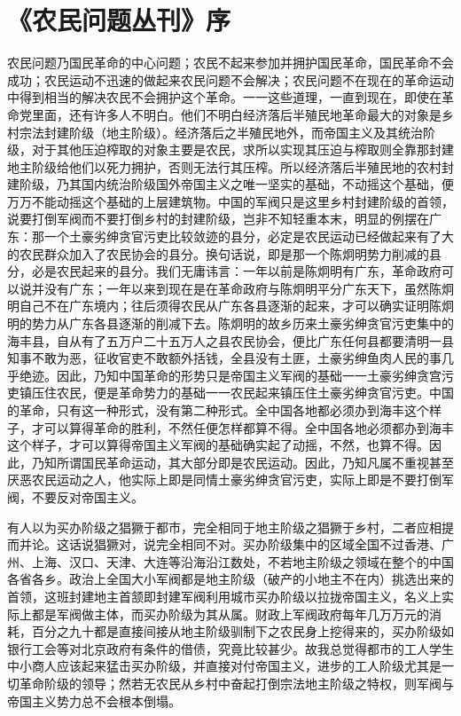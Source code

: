 \section[《农民问题丛刊》序（一九二六年九月一日）]{《农民问题丛刊》序}


农民问题乃国民革命的中心问题；农民不起来参加并拥护国民革命，国民革命不会成功；农民运动不迅速的做起来农民问题不会解决；农民问题不在现在的革命运动中得到相当的解决农民不会拥护这个革命。一一这些道理，一直到现在，即使在革命党里面，还有许多人不明白。他们不明白经济落后半殖民地革命最大的对象是乡村宗法封建阶级（地主阶级）。经济落后之半殖民地外，而帝国主义及其统治阶级，对于其他压迫榨取的对象主要是农民，求所以实现其压迫与榨取则全靠那封建地主阶级给他们以死力拥护，否则无法行其压榨。所以经济落后半殖民地的农村封建阶级，乃其国内统治阶级国外帝国主义之唯一坚实的基础，不动摇这个基础，便万万不能动摇这个基础的上层建筑物。中国的军阀只是这里乡村封建阶级的首领，说要打倒军阀而不要打倒乡村的封建阶级，岂非不知轻重本末，明显的例摆在广东：那一个土豪劣绅贪官污吏比较敛迹的县分，必定是农民运动已经做起来有了大的农民群众加入了农民协会的县分。换句话说，即是那一个陈炯明势力削减的县分，必是农民起来的县分。我们无庸讳言：一年以前是陈炯明有广东，革命政府可以说并没有广东；一年以来到现在是在革命政府与陈炯明平分广东天下，虽然陈炯明自己不在广东境内；往后须得农民从广东各县逐渐的起来，才可以确实证明陈炯明的势力从广东各县逐渐的削减下去。陈炯明的故乡历来土豪劣绅贪官污吏集中的海丰县，自从有了五万户二十五万人之县农民协会，便比广东任何县都要清明一县知事不敢为恶，征收官吏不敢额外括钱，全县没有土匪，土豪劣绅鱼肉人民的事几乎绝迹。因此，乃知中国革命的形势只是帝国主义军阀的基础一一土豪劣绅贪宫污吏镇压住农民，便是革命势力的基础一一农民起来镇压住土豪劣绅贪官污吏。中国的革命，只有这一种形式，没有第二种形式。全中国各地都必须办到海丰这个样子，才可以算得革命的胜利，不然任便怎样都算不得。全中国各地必须都办到海丰这个样子，才可以算得帝国主义军阀的基础确实起了动摇，不然，也算不得。因此，乃知所谓国民革命运动，其大部分即是农民运动。因此，乃知凡属不重视甚至厌恶农民运动之人，他实际上即是同情土豪劣绅贪官污吏，实际上即是不要打倒军阀，不要反对帝国主义。

有人以为买办阶级之猖獗于都市，完全相同于地主阶级之猖獗于乡村，二者应相提而并论。这话说猖獗对，说完全相同不对。买办阶级集中的区域全国不过香港、广州、上海、汉口、天津、大连等沿海沿江数处，不若地主阶级之领域在整个的中国各省各乡。政治上全国大小军阀都是地主阶级（破产的小地主不在内）挑选出来的首领，这班封建地主首颔即封建军阀利用城市买办阶级以拉拢帝国主义，名义上实际上都是军阀做主体，而买办阶级为其从属。财政上军阀政府每年几万万元的消耗，百分之九十都是直接间接从地主阶级驯制下之农民身上挖得来的，买办阶级如银行工会等对北京政府有条件的借债，究竟比较甚少。故我总觉得都市的工人学生中小商人应该起来猛击买办阶级，并直接对付帝国主义，进步的工人阶级尤其是一切革命阶级的领导；然若无农民从乡村中奋起打倒宗法地主阶级之特权，则军阀与帝国主义势力总不会根本倒塌。

